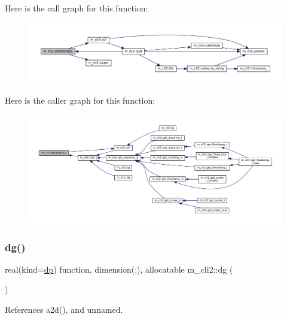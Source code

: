 Here is the call graph for this function\+:\nopagebreak
\begin{figure}[H]
\begin{center}
\leavevmode
\includegraphics[width=350pt]{namespacem__cli2_a1029304d495b2bf791e03cfab5983bbb_cgraph}
\end{center}
\end{figure}
Here is the caller graph for this function\+:\nopagebreak
\begin{figure}[H]
\begin{center}
\leavevmode
\includegraphics[width=350pt]{namespacem__cli2_a1029304d495b2bf791e03cfab5983bbb_icgraph}
\end{center}
\end{figure}
\mbox{\label{namespacem__cli2_a06ddc2533e5122b8f898bae7db0fea87}} 
\subsubsection{\texorpdfstring{dg()}{dg()}}
{\footnotesize\ttfamily real(kind=\mbox{\hyperlink{namespacem__cli2_acf83f1963cf6a56ad0221cfcf5402440}{dp}}) function, dimension(\+:), allocatable m\+\_\+cli2\+::dg (\begin{DoxyParamCaption}{ }\end{DoxyParamCaption})\hspace{0.3cm}{\ttfamily [private]}}



References a2d(), and unnamed.

